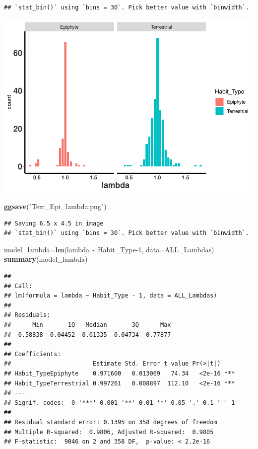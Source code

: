 \documentclass[
]{book}
\newenvironment{Shaded}{\begin{snugshade}}{\end{snugshade}}
\newcommand{\AttributeTok}[1]{\textcolor[rgb]{0.13,0.29,0.53}{#1}}
\newcommand{\DecValTok}[1]{\textcolor[rgb]{0.00,0.00,0.81}{#1}}
\newcommand{\FunctionTok}[1]{\textcolor[rgb]{0.13,0.29,0.53}{\textbf{#1}}}
\newcommand{\NormalTok}[1]{#1}
\newcommand{\OtherTok}[1]{\textcolor[rgb]{0.56,0.35,0.01}{#1}}
\newcommand{\SpecialCharTok}[1]{\textcolor[rgb]{0.81,0.36,0.00}{\textbf{#1}}}
\newcommand{\StringTok}[1]{\textcolor[rgb]{0.31,0.60,0.02}{#1}}
\theoremstyle{definition}
\theoremstyle{definition}
\theoremstyle{definition}
\theoremstyle{definition}
\theoremstyle{remark}
\begin{document}
\begin{verbatim}
## `stat_bin()` using `bins = 30`. Pick better value with `binwidth`.
\end{verbatim}

\includegraphics{Diagnostico_Poblacional_files/figure-latex/chap16_23-1.pdf}

\begin{Shaded}
\begin{Highlighting}[]
\FunctionTok{ggsave}\NormalTok{(}\StringTok{"Terr\_Epi\_lambda.png"}\NormalTok{)}
\end{Highlighting}
\end{Shaded}

\begin{verbatim}
## Saving 6.5 x 4.5 in image
## `stat_bin()` using `bins = 30`. Pick better value with `binwidth`.
\end{verbatim}

\begin{Shaded}
\begin{Highlighting}[]
\NormalTok{model\_lambda}\OtherTok{=}\FunctionTok{lm}\NormalTok{(lambda }\SpecialCharTok{\textasciitilde{}}\NormalTok{ Habit\_Type}\DecValTok{{-}1}\NormalTok{, }\AttributeTok{data=}\NormalTok{ALL\_Lambdas)}
\FunctionTok{summary}\NormalTok{(model\_lambda)}
\end{Highlighting}
\end{Shaded}

\begin{verbatim}
## 
## Call:
## lm(formula = lambda ~ Habit_Type - 1, data = ALL_Lambdas)
## 
## Residuals:
##      Min       1Q   Median       3Q      Max 
## -0.58838 -0.04452  0.01335  0.04734  0.77877 
## 
## Coefficients:
##                       Estimate Std. Error t value Pr(>|t|)    
## Habit_TypeEpiphyte    0.971600   0.013069   74.34   <2e-16 ***
## Habit_TypeTerrestrial 0.997261   0.008897  112.10   <2e-16 ***
## ---
## Signif. codes:  0 '***' 0.001 '**' 0.01 '*' 0.05 '.' 0.1 ' ' 1
## 
## Residual standard error: 0.1395 on 358 degrees of freedom
## Multiple R-squared:  0.9806, Adjusted R-squared:  0.9805 
## F-statistic:  9046 on 2 and 358 DF,  p-value: < 2.2e-16
\end{verbatim}
\end{document}
